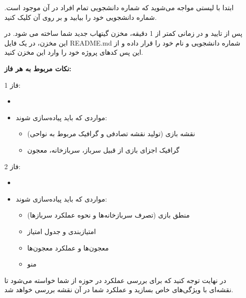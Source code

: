 \documentclass[]{article}
\begin{document}
ابتدا با لیستی مواجه می‌شوید که شماره دانشجویی تمام افراد در آن موجود است. شماره دانشجویی خود را بیابید و بر روی آن کلیک کنید.

پس از تایید و در زمانی کمتر از 1 دقیقه، مخزن گیتهاب جدید شما ساخته می شود. در این مخزن، در یک فایل README.md شماره دانشجویی و نام خود را قرار داده و از این پس کدهای پروژه خود را وارد این مخزن کنید.
\newline

\textbf{نکات مربوط به هر فاز:}

{فاز 1:}
\begin{itemize}
    \item{
    }
    \item{
    مواردی که باید پیاده‌سازی شوند:
    \begin{itemize}
        \item{نقشه بازی (تولید نقشه تصادفی و گرافیک مربوط به نواحی)
}
        \item{گرافیک اجزای بازی از قبیل سرباز، سربازخانه، معجون
}
    \end{itemize}
    }
\end{itemize}

{فاز 2:}
\begin{itemize}
    \item{
    }
    \item{
    مواردی که باید پیاده‌سازی شوند:
    \begin{itemize}
        \item{منطق بازی (تصرف سربازخانه‌ها و نحوه عملکرد سرباز‌ها)
}
        \item{امتیازبندی و جدول امتیاز
}
        \item{معجون‌ها و عملکرد معجون‌ها
        
}
        \item{منو

}
\end{itemize}
    }
\end{itemize}

در نهایت توجه کنید که برای بررسی عملکرد در حوزه
از شما خواسته می‌شود تا نقشه‌ای با ویژگی‌های خاص بسازید و عملکرد شما در آن نقشه بررسی ‌خواهد شد.
\newline
\end{document}
